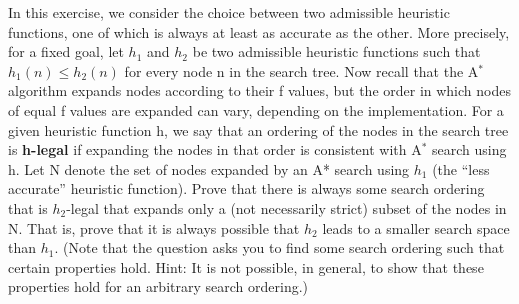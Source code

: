 \documentclass[12pt]{article}
\newenvironment{problem}[2][Problem]{\begin{trivlist}
\item[\hskip \labelsep {\bfseries #1}\hskip \labelsep {\bfseries #2.}]}{\end{trivlist}}
\begin{document}
\begin{problem}{4}
	In this exercise, we consider the choice between two admissible heuristic functions, one of which is always at least as accurate as the other.
	More precisely, for a fixed goal, let $h_1$ and $h_2$ be two admissible heuristic functions such that $h_1(n) \le h_2(n)$ for every node n in the search tree.
	Now recall that the A$^*$ algorithm expands nodes according to their f values, but the order in which nodes of equal f values are expanded can vary, depending on the implementation.
	For a given heuristic function h, we say that an ordering of the nodes in the search tree is \textbf{h-legal} if expanding the nodes in that order is consistent with A$^*$ search using h.
	Let N denote the set of nodes expanded by an A* search using $h_1$ (the ``less accurate'' heuristic function).
	Prove that there is always some search ordering that is $h_2$-legal that expands only a (not necessarily strict) subset of the nodes in N.
	That is, prove that it is always possible that $h_2$ leads to a smaller search space than $h_1$.
	(Note that the question asks you to find some search ordering such that certain properties hold.
	Hint: It is not possible, in general, to show that these properties hold for an arbitrary search ordering.)
\end{problem}
\end{document}
